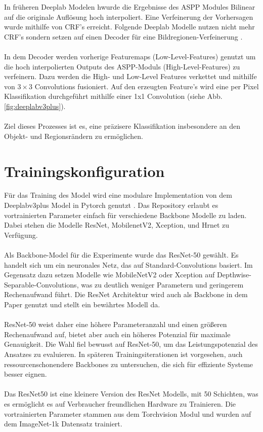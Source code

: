 \documentclass[12pt,DIV=15,BCOR=15mm,twoside,headsepline,abstract=true,listof=totoc,bibliography=totoc]{scrreprt}
\theoremstyle{remark}    %
\begin{document}
    In früheren Deeplab Modelen hwurde die Ergebnisse des \ac{ASPP} Modules Bilinear auf die originale
    Auflösung hoch interpoliert. Eine Verfeinerung der Vorhersagen wurde mithilfe von CRF's erreicht. 
    Folgende Deeplab Modelle nutzen nicht mehr CRF's sondern setzen auf einen Decoder
    für eine Bildregionen-Verfeinerung \cite{chen2018encoderdecoderatrousseparableconvolution,chen2017rethinkingatrousconvolutionsemantic}.\\\\
    In dem Decoder werden vorherige Featuremaps (Low-Level-Features) genutzt um die hoch interpolierten Outputs des \ac{ASPP}-Moduls (High-Level-Features) 
    zu verfeinern. Dazu werden die High- und Low-Level Features verkettet und mithilfe von $3\times3$ Convolutions fusioniert. 
    Auf den erzeugten Feature's wird eine per Pixel Klassifikation durchgeführt mithilfe einer 1x1 Convolution (siehe Abb. \ref{fig:deeplabv3plus}).\\\\
    Ziel dieses Prozesses ist es, eine präzisere Klassifikation insbesondere an den Objekt- und Regionsrändern zu ermöglichen.

    \section{Trainingskonfiguration}
    Für das Training des Model wird eine modulare Implementation von dem Deeplabv3plus Model in Pytorch genutzt \cite{Deeplabv3plus_PyTorch}. Das 
    Repository erlaubt es vortrainierten Parameter einfach für verschiedene Backbone Modelle zu laden. Dabei stehen die Modelle ResNet, MobilenetV2, 
    Xception, und Hrnet zu Verfügung.\\\\
    Als Backbone-Model für die Experimente wurde das ResNet-50 gewählt. Es handelt sich um ein neuronales Netz, das auf Standard-Convolutions basiert.
    Im Gegensatz dazu setzen Modelle wie MobileNetV2 oder Xception auf Depthwise-Separable-Convolutions, was zu deutlich weniger Parametern und geringerem 
    Rechenaufwand führt. Die ResNet Architektur wird auch als Backbone in dem Paper \cite{chen2017rethinkingatrousconvolutionsemantic,HaitzHuebnerUlrich2022} 
    genutzt und stellt ein bewährtes Modell da.\\\\
    ResNet-50 weist daher eine höhere Parameteranzahl und einen größeren Rechenaufwand auf, bietet aber auch ein höheres Potenzial für 
    maximale Genauigkeit. Die Wahl fiel bewusst auf ResNet-50, um das Leistungspotenzial des Ansatzes zu evaluieren. In späteren Trainingsiterationen ist vorgesehen, 
    auch ressourcenschonendere Backbones zu untersuchen, die sich für effiziente Systeme besser eignen.\\\\
    Das ResNet50 ist eine kleinere Version des ResNet Modells, mit 50 Schichten, was es ermöglicht es auf Verbraucher freundlichen Hardware zu Trainieren. Die 
    vortrainierten Parameter stammen aus dem Torchvision Modul und wurden auf dem ImageNet-1k Datensatz \cite{deng2009imagenet} trainiert.
\end{document}
